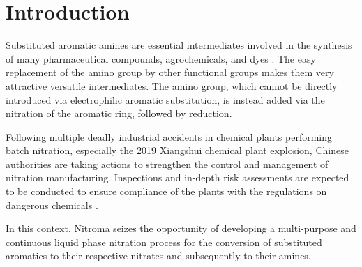 \section{Introduction}
\label{sec:introduction}
Substituted aromatic amines are essential intermediates involved in the synthesis of many pharmaceutical compounds, agrochemicals, and dyes \cite{vogt_amines_2000}. The easy replacement of the amino group by other functional groups makes them very attractive versatile intermediates. The amino group, which cannot be directly introduced via electrophilic aromatic substitution, is instead added via the nitration of the aromatic ring, followed by reduction.

Following multiple deadly industrial accidents in chemical plants performing batch nitration, especially the 2019 Xiangshui chemical plant explosion, Chinese authorities are taking actions to strengthen the control and management of nitration manufacturing. Inspections and in-depth risk assessments are expected to be conducted to ensure compliance of the plants with the regulations on dangerous chemicals \cite{noauthor_china_2019}. 

In this context, Nitroma seizes the opportunity of developing a multi-purpose and continuous liquid phase nitration process for the conversion of substituted aromatics to their respective nitrates and subsequently to their amines. 

